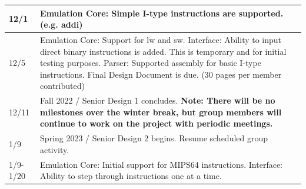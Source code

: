\documentclass[
    paper=letter,
    parskip=half,
    fontsize=12pt,
    titlepage=firstiscover,
    toc=bibliography,
    numbers=endperiod
]{scrartcl}
\begin{document}
{\begin{tabularx}{\textwidth}{|l|X|}
        12/1          & Emulation Core: Simple I-type instructions are supported. (e.g. addi)                                                                                                                                                                                                                                                                                                                                                                \\\hline
        12/5          & Emulation Core: Support for lw and sw. \newline Interface: Ability to input direct binary instructions is added. This is temporary and for initial testing purposes. \newline Parser: Supported assembly for basic I-type instructions. \newline Final Design Document is due. (30 pages per member contributed)                                                                                                                     \\\hline
        12/11         & Fall 2022 / Senior Design 1 concludes. \newline \textbf{Note: There will be no milestones over the winter break, but group members will continue to work on the project with periodic meetings.}                                                                                                                                                                                                                                     \\\hline
        1/9           & Spring 2023 / Senior Design 2 begins. Resume scheduled group activity.                                                                                                                                                                                                                                                                                                                                                               \\\hline
        1/9-1/20      & Emulation Core: Initial support for MIPS64 instructions. \newline Interface: Ability to step through instructions one at a time.                                                                                                                                                                                                                                                                                                     \\\hline

\end{tabularx}}
\end{document}
